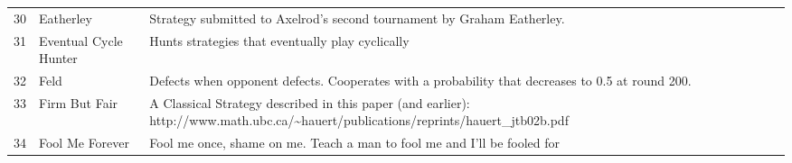 \begin{table}[H]
\begin{adjustbox}{height=0.8\textwidth, width=1.1\textwidth}
\begin{tabular}{rlll}
	30   & Eatherley                   & Strategy submitted to Axelrod's second tournament by Graham Eatherley.                                                            \\
	31   & Eventual Cycle Hunter       & Hunts strategies that eventually play cyclically                                                                                  \\
	32   & Feld                        & Defects when opponent defects. Cooperates with a probability that decreases
	to 0.5 at round 200.                                                                                                                                                                                                                                                                                                                                                                                                                                                                                                                                                                                                                                                                                                                                                                                                                                                                                                                     \\
	33   & Firm But Fair               & A Classical Strategy described in this paper (and earlier):
	http://www.math.ubc.ca/\textasciitilde{}hauert/publications/reprints/hauert\_jtb02b.pdf                                                                                                                                                                                                                                                                                                                                                                                                                                                                                                                                                                                                                                                                                                                                                                                                                                                                                   \\
	34   & Fool Me Forever             & Fool me once, shame on me. Teach a man to fool me and I'll be fooled for

\end{tabular}
\end{adjustbox}
\end{table}
